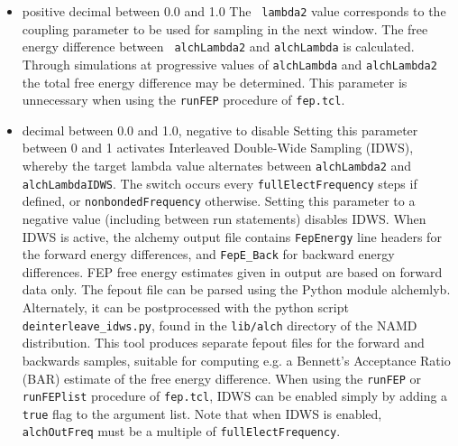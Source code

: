 \begin{itemize}
\item
{} {positive decimal between 0.0 and 1.0} {The {\tt
lambda2} value corresponds to the coupling parameter to be used for
sampling in the next window.  The free energy difference between {\tt
alchLambda2} and {\tt alchLambda} is calculated.  Through simulations
at progressive values of {\tt alchLambda} and {\tt alchLambda2} the
total free energy difference may be determined.
This parameter is unnecessary when using the \texttt{runFEP} procedure of
\texttt{fep.tcl}.}


\item
{}
{decimal between 0.0 and 1.0, negative to disable}
{Setting this parameter between 0 and 1 activates Interleaved Double-Wide Sampling (IDWS), whereby the target lambda value alternates between {\tt alchLambda2} and {\tt alchLambdaIDWS}.
The switch occurs every {\tt fullElectFrequency} steps if defined, or {\tt nonbondedFrequency} otherwise.
Setting this parameter to a negative value (including between run statements) disables IDWS.
When IDWS is active, the alchemy output file contains {\tt FepEnergy} line headers for the forward energy differences, and {\tt FepE\_Back} for backward energy differences.
FEP free energy estimates given in output are based on forward data only.
The fepout file can be parsed using the Python module alchemlyb.
Alternately, it can be postprocessed with the python script \texttt{deinterleave\_idws.py}, found in
the \texttt{lib/alch} directory of the NAMD distribution.
This tool produces separate fepout files for the forward and backwards samples, suitable for computing e.g.
a Bennett's Acceptance Ratio (BAR) estimate of the free energy difference.
When using the \texttt{runFEP} or \texttt{runFEPlist} procedure of \texttt{fep.tcl}, IDWS can be enabled
simply by adding a \texttt{true} flag to the argument list.
Note that when IDWS is enabled, \texttt{alchOutFreq} must be a multiple of \texttt{fullElectFrequency}.
}


\end{itemize}
